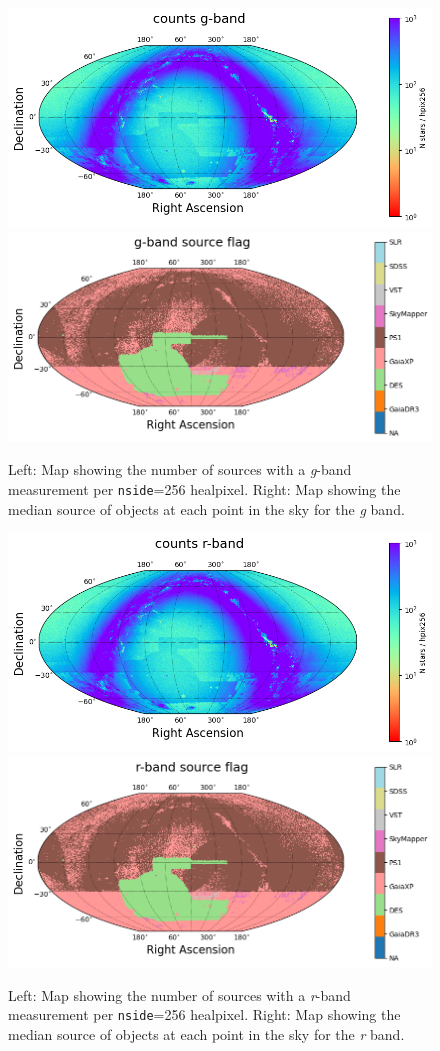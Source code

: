\begin{figure}
    \includegraphics[width=0.48\linewidth]{./figures/source_density_maps/g-band_counts_full.png}
    \includegraphics[width=0.48\linewidth]{./figures/source_survey_maps/g-band_source.png}
    \caption{Left: Map showing the number of sources with a \textit{g}-band measurement per \texttt{nside}=256 healpixel.
    Right: Map showing the median source of objects at each point in the sky for the \textit{g} band.}
    \label{fig:monster-g}
\end{figure}
\begin{figure}
    \includegraphics[width=0.48\linewidth]{./figures/source_density_maps/r-band_counts_full.png}
    \includegraphics[width=0.48\linewidth]{./figures/source_survey_maps/r-band_source.png}
    \caption{Left: Map showing the number of sources with a \textit{r}-band measurement per \texttt{nside}=256 healpixel.
    Right: Map showing the median source of objects at each point in the sky for the \textit{r} band.}
    \label{fig:monster-r}
\end{figure}
